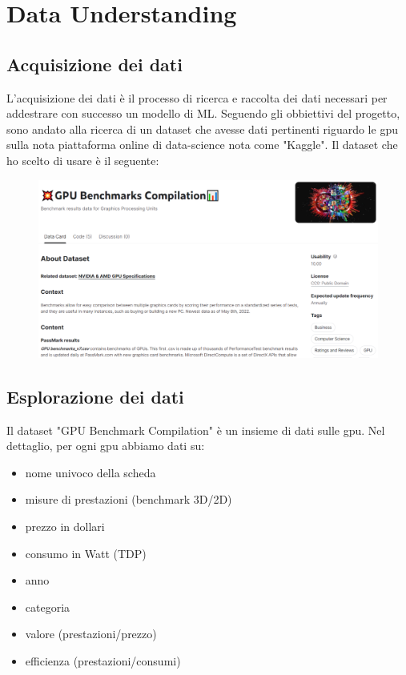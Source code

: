 \documentclass{article}
\begin{document}
\newpage
\section{Data Understanding}
    \subsection{Acquisizione dei dati}
    L'acquisizione dei dati è il processo di ricerca e raccolta dei dati necessari per addestrare con successo un modello di ML. 
    Seguendo gli obbiettivi del progetto, sono andato alla ricerca di un dataset che avesse dati pertinenti riguardo le gpu
    sulla nota piattaforma online di data-science nota come "Kaggle".
    Il dataset che ho scelto di usare è il seguente:
    \begin{figure}[H]
    \centering
    \includegraphics[width=0.95\linewidth]{kaggle_dataset.png}
    \end{figure}
    
    
    \subsection{Esplorazione dei dati}
    Il dataset "GPU Benchmark Compilation" è un insieme di dati sulle gpu.
    Nel dettaglio, per ogni gpu abbiamo dati su:
     \begin{itemize}
        \item nome univoco della scheda 
        \item misure di prestazioni (benchmark 3D/2D)
        \item prezzo in dollari
        \item consumo in Watt (TDP)
        \item anno 
        \item categoria
        \item valore (prestazioni/prezzo)
        \item efficienza (prestazioni/consumi)
        \end{itemize}
\end{document}

